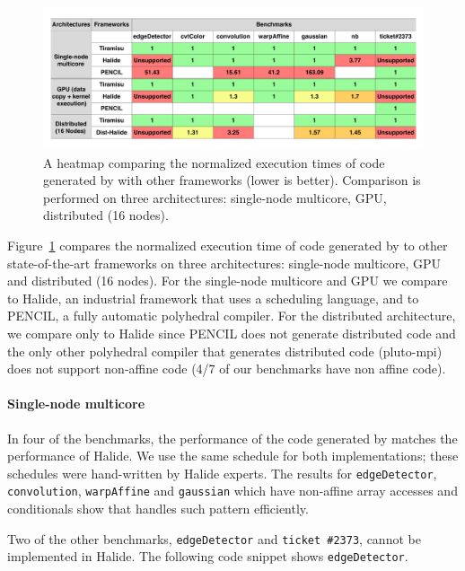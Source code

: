 \begin{figure}[t]
\centering
\includegraphics[width=1.05\columnwidth,trim=50 10 10 10]{./figures/tiramisu_heatmap.pdf}
\vspace{-0.5cm}
\caption{A heatmap comparing the normalized execution times of code generated by \framework{} with other frameworks (lower is better).  Comparison is performed on three architectures: single-node multicore, GPU, distributed (16 nodes).}
\label{fig:speedup}

\end{figure}

Figure~\ref{fig:speedup} compares the normalized execution time of code generated by \framework{} to other state-of-the-art frameworks on three architectures: single-node multicore, GPU and distributed (16 nodes).  For the single-node multicore and GPU we compare \framework{} to Halide, an industrial framework that uses a scheduling language, and to PENCIL, a fully automatic polyhedral compiler.  For the distributed architecture, we compare only to Halide since PENCIL does not generate distributed code and the only other polyhedral compiler that generates distributed code (pluto-mpi) does not support non-affine code (4/7 of our benchmarks have non affine code).

\paragraph{Single-node multicore}
In four of the benchmarks, the performance of the code generated by \framework{} matches the performance of Halide.  We use the same schedule for both implementations; these schedules were hand-written by Halide experts.  The results for \texttt{edgeDetector}, \texttt{convolution}, \texttt{warpAffine} and \texttt{gaussian} which have non-affine array accesses and conditionals show that \framework{} handles such pattern efficiently.

Two of the other benchmarks, \texttt{edgeDetector} and \texttt{ticket \#2373}, cannot be implemented in Halide.  The following code snippet shows \texttt{edgeDetector}.

